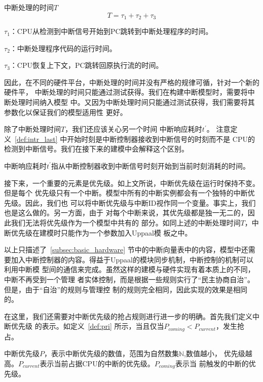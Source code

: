 \begin{definition}
	中断处理的时间$T$
	\label{def:intr_time}
	\begin{equation}
		T = \tau_1 + \tau_2 + \tau_3
	\end{equation}
	
	$\tau_1$：CPU从检测到中断信号开始到PC跳转到中断处理程序的时间。
	
	$\tau_2$：中断处理程序代码的运行时间。
	
	$\tau_3$：CPU恢复上下文，PC跳转回原执行流的时间。
\end{definition}

因此，在不同的硬件平台，中断处理的时间并没有严格的规律可循，针对一个新的硬件平，
中断处理的时间只能通过测试获得。我们在构建中断模型时，需要将中断处理时间纳入模型
中。又因为中断处理时间只能通过测试获得，我们需要将其参数化以保证我们的模型适用性
更好。

除了中断处理时间$T$，我们还应该关心另一个时间 \pozhehao 中断响应耗时$t^\prime$。
注意定义~\ref{def:intr_last} 中开始时刻是中断控制器接收到中断信号的时刻而不是
CPU的检测到中断信号。我们在接下来的建模中会解释这个区别。

\begin{definition}
	中断响应耗时$t^\prime$指从中断控制器收到中断信号时刻开始到当前时刻消耗的时间。
	\label{def:intr_last}
\end{definition}

接下来，一个重要的元素是优先级。如上文所说，中断优先级在运行时保持不变。但是每个
优先级只有一个中断。模型中所有的中断实例都会有一个独特的中断优先级。因此，我们也
可以将中断优先级与中断ID视作同一个变量。事实上，我们也是这么做的。另一方面，由于
对每个中断来说，其优先级都是独一无二的，因此我们无法将优先级作为一个模型中共有的
部分。如同上述的中断处理时间$T$，中断优先级在建模时只能作为一个参数加入Uppaal模
板之中。

以上只描述了~\ref{subsec:basic_hardware} 节中的中断向量表中的内容，模型中还需
要加入中断控制器的内容。得益于Uppaal的模块同步机制，中断控制的机制可以利用中断模
型间的通信来完成。虽然这样的建模与硬件实现有着本质上的不同，中断不再受到一个管理
者实体控制，而是根据一些规则实行了“民主协商自治”。但是，由于“自治”的规则与管理控
制的规则完全相同，因此实现的效果是相同的。

在这里，我们还需要对中断优先级的抢占规则进行进一步的明确。首先我们定义中断优先级
的表示。如定义~\ref{def:pri} 所示，当且仅当$P_{coming} < P_{current}$，发生抢
占。

\begin{definition}
	中断优先级$P$，表示中断优先级的数值，范围为自然数集$\mathbb{N}$,数值越小，
	优先级越高。$P_{current}$表示当前占据CPU的中断的优先级。$P_{coming}$表示当
	前触发的中断的优先级。
	\label{def:pri}
\end{definition}


